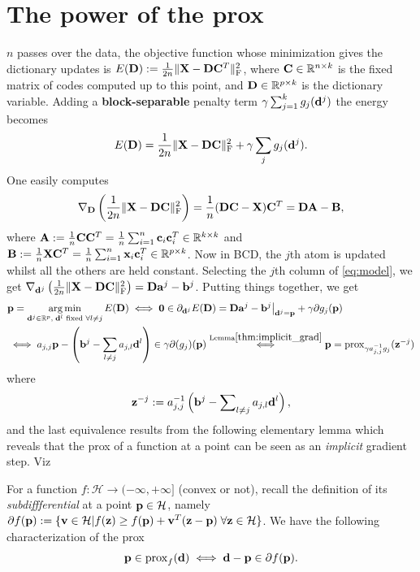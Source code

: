 \section{The power of the prox}
 $n$ passes over the data, the objective function whose minimization gives the dictionary updates is $E(\mathbf{D}) := \frac{1}{2n}\|\mathbf{X} - \mathbf{D}\mathbf{C}^T\|_{\text{F}}^2$, where $\mathbf{C} \in \mathbb R^{n \times k}$ is the fixed matrix of codes computed up to this point, and $\mathbf{D} \in \mathbb R^{p \times k}$ is the dictionary variable. Adding a \textbf{block-separable} penalty term $\gamma\sum_{j=1}^kg_j(\mathbf{d}^j)$ the energy becomes
\begin{equation}
  E(\mathbf{D}) = \frac{1}{2n}\|\mathbf{X} - \mathbf{D}\mathbf{C}\|_{\text{F}}^2 + \gamma \sum_{j} g_j(\mathbf{d}^j).
  \label{eq:model}
\end{equation}
One easily computes
$$\nabla_{\mathbf{D}}\left(\frac{1}{2n}\|\mathbf{X} - \mathbf{D}\mathbf{C}\|_{\text{F}}^2\right) = \frac{1}{n}(\mathbf{DC} - \mathbf{X})\mathbf{C}^T = \mathbf{DA} - \mathbf{B},$$
where $ \mathbf{A} := \frac{1}{n}\mathbf{C}\mathbf{C}^T = \frac{1}{n}\sum_{i=1}^n\mathbf{c}_i\mathbf{c}_i^T \in \mathbb R^{k \times k}$ and $\mathbf{B} := \frac{1}{n}\mathbf{X}\mathbf{C}^T = \frac{1}{n}\sum_{i=1}^n\mathbf{x}_i\mathbf{c}_i^T \in \mathbb R^{p \times k}$. 
Now in BCD, the $j$th atom is updated whilst all the others are held constant. 
Selecting the $j$th column of \eqref{eq:model}, we get
$\nabla_{\mathbf{d}^j}\left(\frac{1}{2n}\|\mathbf{X} - \mathbf{D}\mathbf{C}\|_{\text{F}}^2\right) = \mathbf{D}\mathbf{a}^j - \mathbf{b}^j$. Putting things together, we get
\begin{eqnarray*}
  \begin{split}
    &\mathbf{p} = \operatorname*{arg\,min}_{\mathbf{d}^j \in \mathbb R^p,\;\mathbf{d}^l\text{ fixed }\forall l \ne j}E(\mathbf{D}) \iff
    \mathbf{0} \in \partial_{\mathbf{d}^j}E(\mathbf{D}) = \mathbf{D}\mathbf{a}^j-\mathbf{b}^j\big|_{\mathbf{d}^j = \mathbf{p}} + \gamma \partial g_j(\mathbf{p})\\
    &\iff a_{j,j}\mathbf{p} - \left(\mathbf{b}^j-\sum_{l \ne j}a_{j,l}\mathbf{d}^l\right) \in \gamma \partial (g_j)(\mathbf{p})
    \overset{\text{Lemma} \ref{thm:implicit_grad}}{\iff} \mathbf{p} = \operatorname{prox}_{\gamma a_{j,j}^{-1}g_j}(\mathbf{z}^{-j})
\end{split}
\end{eqnarray*}
where
\[
  \mathbf{z}^{-j} := a_{j,j}^{-1}\left(\mathbf{b}^j-\sum\nolimits_{l \ne j}a_{j,l}\mathbf{d}^l\right),
\]
and the last equivalence results from the following elementary lemma which reveals that the prox of a function at a point can be seen as an \textit{implicit} gradient step. Viz
\begin{lemma}
  For a function $f: \mathcal H \rightarrow (-\infty,+\infty]$ (convex or not), recall the definition of its \textit{subdiffferential} at a point $\mathbf{p} \in \mathcal H$, namely  $\partial f(\mathbf{p}) := \{\mathbf{v} \in \mathcal H | f(\mathbf{z}) \ge f(\mathbf{p}) + \mathbf{v}^T(\mathbf{z} - \mathbf{p})\; \forall \mathbf{z} \in \mathcal H\}$. We have the following characterization of the prox
  \begin{equation}
    \mathbf{p} \in \operatorname{prox}_{f}(\mathbf{d}) \iff \mathbf{d}-\mathbf{p} \in \partial f(\mathbf{p}).
\end{equation}

  \label{thm:implicit_grad}
\end{lemma}
